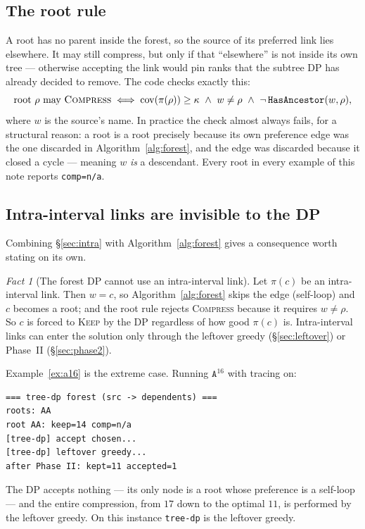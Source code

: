 \documentclass[11pt,a4paper]{article}
\theoremstyle{definition}
\theoremstyle{plain}
\theoremstyle{remark}
\newtheorem{fact}{Fact}
\newcommand{\cov}{\operatorname{cov}}
\newcommand{\pref}{\pi}
\newcommand{\KEEP}{\textnormal{\textsc{Keep}}}
\newcommand{\COMP}{\textnormal{\textsc{Compress}}}
\begin{document}
\subsection{The root rule}

A root has no parent inside the forest, so the source of its preferred
link lies elsewhere. It may still compress, but only if that ``elsewhere''
is not inside its own tree --- otherwise accepting the link would pin
ranks that the subtree DP has already decided to remove. The code checks
exactly this:
\[
  \text{root } \rho \text{ may } \COMP
  \iff
  \cov(\pref(\rho)) \ge \kappa
  \ \wedge\
  w \ne \rho
  \ \wedge\
  \neg\,\texttt{HasAncestor}(w, \rho),
\]
where $w$ is the source's name. In practice the check almost always
fails, for a structural reason: a root is a root precisely because its
own preference edge was the one discarded in
Algorithm~\ref{alg:forest}, and the edge was discarded because it closed
a cycle --- meaning $w$ \emph{is} a descendant. Every root in every
example of this note reports \texttt{comp=n/a}.

\subsection{Intra-interval links are invisible to the DP}
\label{sec:dp:intra}

Combining \S\ref{sec:intra} with Algorithm~\ref{alg:forest} gives a
consequence worth stating on its own.

\begin{fact}[The forest DP cannot use an intra-interval link]
\label{fact:intra-dp}
Let $\pref(c)$ be an intra-interval link. Then $w = c$, so
Algorithm~\ref{alg:forest} skips the edge (self-loop) and $c$ becomes a
root; and the root rule rejects \COMP{} because it requires $w \ne \rho$.
So $c$ is forced to \KEEP{} by the DP regardless of how good
$\pref(c)$ is. Intra-interval links can enter the solution only through
the leftover greedy (\S\ref{sec:leftover}) or Phase~II
(\S\ref{sec:phase2}).
\end{fact}

Example~\ref{ex:a16} is the extreme case. Running $\mathtt{A}^{16}$ with
tracing on:
\begin{verbatim}
=== tree-dp forest (src -> dependents) ===
roots: AA
root AA: keep=14 comp=n/a
[tree-dp] accept chosen...
[tree-dp] leftover greedy...
after Phase II: kept=11 accepted=1
\end{verbatim}
The DP accepts nothing --- its only node is a root whose preference is a
self-loop --- and the entire compression, from $17$ down to the optimal
$11$, is performed by the leftover greedy. On this instance
\texttt{tree-dp} is the leftover greedy.
\end{document}
